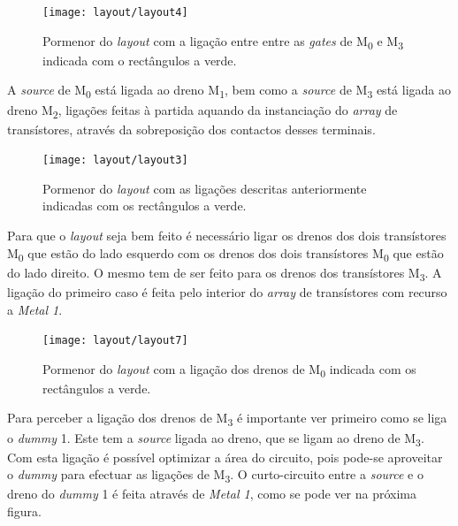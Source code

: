 \documentclass[11pt]{article}
\numberwithin{equation}{section}
\begin{document}
\begin{figure}[H]
	\centering
	\texttt{[image: layout/layout4]}
	\vspace{-0.8em}
	\caption{Pormenor do \textit{layout} com a ligação entre entre as \textit{gates} de M\textsubscript{0} e M\textsubscript{3} indicada com o rectângulos a verde.}
	\vspace{-0.8em}
\end{figure}

A \textit{source} de M\textsubscript{0} está ligada ao dreno M\textsubscript{1}, bem como a \textit{source} de M\textsubscript{3} está ligada ao dreno M\textsubscript{2}, ligações feitas à partida aquando da instanciação do \textit{array} de transístores, através da sobreposição dos contactos desses terminais.

\begin{figure}[H]
	\centering
	\texttt{[image: layout/layout3]}
	\vspace{-0.8em}
	\caption{Pormenor do \textit{layout} com as ligações descritas anteriormente indicadas com os rectângulos a verde.}
	\vspace{-0.8em}
\end{figure}

Para que o \textit{layout} seja bem feito é necessário ligar os drenos dos dois transístores M\textsubscript{0} que estão do lado esquerdo com os drenos dos dois transístores M\textsubscript{0} que estão do lado direito. O mesmo tem de ser feito para os drenos dos transístores M\textsubscript{3}. A ligação do primeiro caso é feita pelo interior do \textit{array} de transístores com recurso a \textit{Metal 1}.

\begin{figure}[H]
	\centering
	\texttt{[image: layout/layout7]}
	\vspace{-0.8em}
	\caption{Pormenor do \textit{layout} com a ligação dos drenos de  M\textsubscript{0} indicada com os rectângulos a verde.}
	\vspace{-0.8em}
\end{figure}

Para perceber a ligação dos drenos de M\textsubscript{3} é importante ver primeiro como se liga o \textit{dummy} 1. Este tem a \textit{source} ligada ao dreno, que se ligam ao dreno de M\textsubscript{3}. Com esta ligação é possível optimizar a área do circuito, pois pode-se aproveitar o \textit{dummy} para efectuar as ligações de M\textsubscript{3}. O curto-circuito entre a \textit{source} e o dreno do \textit{dummy} 1 é feita através de \textit{Metal 1}, como se pode ver na próxima figura.
\end{document}
